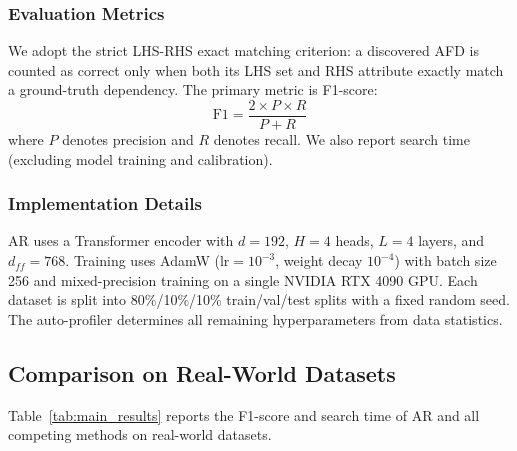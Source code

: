 \documentclass[conference]{IEEEtran}
\begin{document}
\subsubsection{Evaluation Metrics}
We adopt the strict LHS-RHS exact matching criterion: a discovered AFD is counted as correct only when both its LHS set and RHS attribute exactly match a ground-truth dependency. The primary metric is F1-score:
\begin{equation}
    \text{F1} = \frac{2 \times P \times R}{P + R}
\end{equation}
where $P$ denotes precision and $R$ denotes recall. We also report search time (excluding model training and calibration).

\subsubsection{Implementation Details}
AR uses a Transformer encoder with $d = 192$, $H = 4$ heads, $L = 4$ layers, and $d_{ff} = 768$. Training uses AdamW ($\text{lr} = 10^{-3}$, weight decay $10^{-4}$) with batch size 256 and mixed-precision training on a single NVIDIA RTX 4090 GPU. Each dataset is split into 80\%/10\%/10\% train/val/test splits with a fixed random seed. The auto-profiler determines all remaining hyperparameters from data statistics.

\subsection{Comparison on Real-World Datasets}\label{sec:exp_real}

Table~\ref{tab:main_results} reports the F1-score and search time of AR and all competing methods on real-world datasets.
\end{document}
